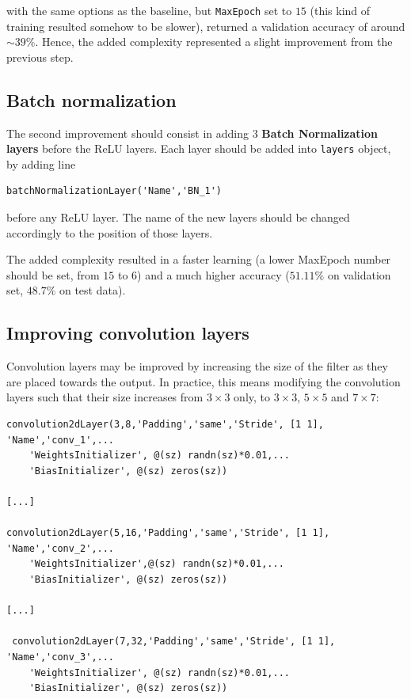 \documentclass[a4paper, 11pt]{article} %
\begin{document}
with the same options as the baseline, but \texttt{MaxEpoch} set to $15$ (this kind of training resulted somehow to be slower), returned a validation accuracy of around $\sim 39\%$. Hence, the added complexity represented a slight improvement from the previous step.

\subsection{Batch normalization}

The second improvement should consist in adding $3$ \textbf{Batch Normalization layers} before the ReLU layers. Each layer should be added into \texttt{layers} object, by adding line

\begin{lstlisting}
batchNormalizationLayer('Name','BN_1')
\end{lstlisting} 

before any ReLU layer. The name of the new layers should be changed accordingly to the position of those layers.

The added complexity resulted in a faster learning (a lower MaxEpoch number should be set, from $15$ to $6$) and a much higher accuracy ($51.11\%$ on validation set, $48.7\%$ on test data).

\subsection{Improving convolution layers}

Convolution layers may be improved by increasing the size of the filter as they are placed towards the output. In practice, this means modifying the convolution layers such that their size increases from $3\times 3$ only, to $3 \times 3$, $5\times 5$ and $7 \times 7$:

\begin{lstlisting}
convolution2dLayer(3,8,'Padding','same','Stride', [1 1], 'Name','conv_1',...
    'WeightsInitializer', @(sz) randn(sz)*0.01,...
    'BiasInitializer', @(sz) zeros(sz))

[...]

convolution2dLayer(5,16,'Padding','same','Stride', [1 1], 'Name','conv_2',...
    'WeightsInitializer',@(sz) randn(sz)*0.01,...
    'BiasInitializer', @(sz) zeros(sz))

[...]

 convolution2dLayer(7,32,'Padding','same','Stride', [1 1], 'Name','conv_3',...
    'WeightsInitializer', @(sz) randn(sz)*0.01,...
    'BiasInitializer', @(sz) zeros(sz))
\end{lstlisting}
\end{document}
